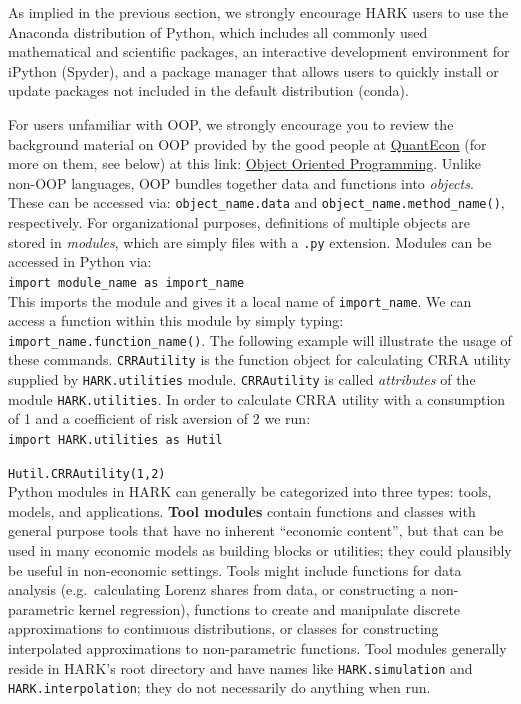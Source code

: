 \documentclass[12pt,titlepage,letterpaper]{econtex}
\begin{document}
{As implied in the previous section, we strongly encourage HARK users to use the Anaconda distribution of Python, which includes all commonly used mathematical and scientific packages, an interactive development environment for iPython (Spyder), and a package manager that allows users to quickly install or update packages not included in the default distribution (conda).

For users unfamiliar with OOP, we strongly encourage you to review the background material on OOP provided by the good people at \href{http://quant-econ.net/}{QuantEcon} (for more on them, see below) at this link: \href{http://quant-econ.net/py/python_oop.html}{Object Oriented Programming}. Unlike non-OOP languages, OOP bundles together data and functions into \textit{objects}. These can be accessed via: \texttt{object\_name.data} and \texttt{object\_name.method\_name()}, respectively. For organizational purposes, definitions of multiple objects are stored in \textit{modules}, which are simply files with a \texttt{.py} extension. Modules can be accessed in Python via:\\

\texttt{import module\_name as import\_name}
\\

\noindent
This imports the module and gives it a local name of \texttt{import\_name}. We can access a function within this module by simply typing: \texttt{import\_name.function\_name()}. The following example will illustrate the usage of these commands. \texttt{CRRAutility} is the function object for calculating CRRA utility supplied by \texttt{HARK.utilities} module. \texttt{CRRAutility} is called \textit{attributes} of the module  \texttt{HARK.utilities}. In order to calculate CRRA utility with a consumption of 1 and a coefficient of risk aversion of 2 we run:\\

\texttt{import HARK.utilities as Hutil}

\texttt{Hutil.CRRAutility(1,2)}\\

Python modules in HARK can generally be categorized into three types: tools, models, and applications.  \textbf{Tool modules} contain functions and classes with general purpose tools that have no inherent ``economic content'', but that can be used in many economic models as building blocks or utilities; they could plausibly be useful in non-economic settings.  Tools might include functions for data analysis (e.g.\ calculating Lorenz shares from data, or constructing a non-parametric kernel regression), functions to create and manipulate discrete approximations to continuous distributions, or classes for constructing interpolated approximations to non-parametric functions.  Tool modules generally reside in HARK's root directory and have names like \texttt{HARK.simulation} and \texttt{HARK.interpolation}; they do not necessarily do anything when run.

}
\end{document}
